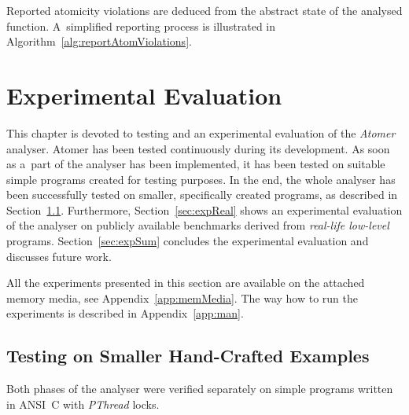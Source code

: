 Reported atomicity violations are deduced from the abstract state of
the analysed function. A~simplified reporting process is illustrated in
Algorithm~\ref{alg:reportAtomViolations}.

\begin{algorithm}[hbt]



    \caption{%
        Reporting atomicity violations from the abstract state of
        an analysed function
    }
    \label{alg:reportAtomViolations}
\end{algorithm}



\chapter{Experimental Evaluation}
\label{chap:exp}

This chapter is devoted to testing and an experimental evaluation of
the \emph{Atomer} analyser. Atomer has been tested continuously during
its development. As soon as a~part of the analyser has been implemented,
it has been tested on suitable simple programs created for testing purposes.
In the end, the whole analyser has been successfully tested on smaller,
specifically created programs, as described in Section~\ref{sec:expPurpos}.
Furthermore, Section~\ref{sec:expReal} shows an experimental evaluation of
the analyser on publicly available benchmarks derived from \emph{real-life
low-level} programs. Section~\ref{sec:expSum} concludes the experimental
evaluation and discusses future work.

All the experiments presented in this section are available on
the attached memory media, see Appendix~\ref{app:memMedia}. The way how
to run the experiments is described in Appendix~\ref{app:man}.


\section{Testing on Smaller Hand-Crafted Examples}
\label{sec:expPurpos}

Both phases of the analyser were verified separately on simple programs
written in ANSI~C with \emph{PThread} locks.

